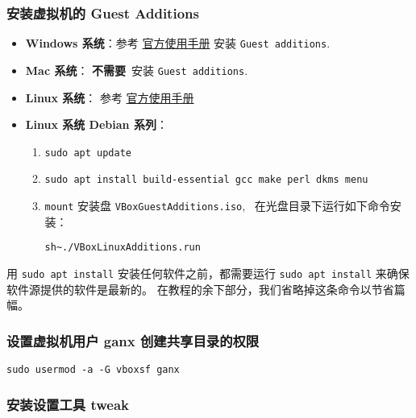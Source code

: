 \documentclass[
    11pt,
    base=hide,
    cite=authoryear,
    device=phone,
    lang=cn,
    mode=simple,
    result=answer,
    toc=onecol,
]{elegantbook_sierxue}
\begin{document}
\subsubsection{安装虚拟机的 Guest Additions}%
\label{ssub:vbox-guest-additions}
\begin{itemize}
    \item \textbf{Windows 系统}：参考
        \href{https://www.virtualbox.org/manual/UserManual.html#additions-windows}{官方使用手册}
        安装 \lstinline{Guest additions}.
    \item \textbf{Mac 系统}： \textbf{不需要}~安装
        \lstinline{Guest additions}.
    \item \textbf{Linux 系统}： 参考
        \href{https://www.virtualbox.org/manual/UserManual.html#additions-linux}{官方使用手册}
    \item \textbf{Linux 系统 Debian 系列}：
        \begin{enumerate}
            \item \lstinline{sudo apt update}
            \item \lstinline{sudo apt install build-essential gcc make perl dkms menu}
            \item \lstinline{mount} 安装盘
                \lstinline{VBoxGuestAdditions.iso},~%
                在光盘目录下运行如下命令安装：
                 \begin{center}\label{center:vm-guest-additions}
                     \lstinline{sh~./VBoxLinuxAdditions.run}
                 \end{center}
        \end{enumerate}
\end{itemize}
\begin{note}\label{note:ubuntu-update}
    用 \lstinline{sudo apt install} 安装任何软件之前，都需要运行
    \lstinline{sudo apt install} 来确保软件源提供的软件是最新的。
    在教程的余下部分，我们省略掉这条命令以节省篇幅。
\end{note}

\subsubsection{设置虚拟机用户 ganx 创建共享目录的权限}%
\label{ssub:vbox-ganx-vboxsf}
\lstinline{sudo usermod -a -G vboxsf ganx}

\subsubsection{安装设置工具 tweak}%
\label{ssub:vm-treak}
\end{document}
